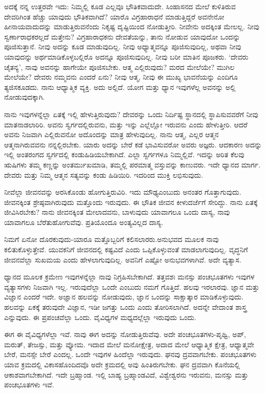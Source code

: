 ಅದಕ್ಕೆ ನನ್ನ ಉತ್ತರವೇ ಇದು: ನಿಮ್ಮಲ್ಲಿ ಕೂಡ ಎಲ್ಲವೂ ಭೌತಿಕವಾದುದೇ. ಸಿಂಹಾಸನದ ಮೇಲೆ ಕುಳಿತಿರುವ ದೇವರಿಗಿಂತ ಹೆಚ್ಚು ಯಾವುದು ಭೌತಿಕವಾಗಿದೆ? ಯಾರೊ ವಿಗ್ರಹಾರಾಧನೆ ಮಾಡುತ್ತಿದ್ದರೆ ಅವನೇನೋ ಹೀನಾಯವಾದುದನ್ನು ಮಾಡುತ್ತಿರುವನೆಂದು ನಿಕೃಷ್ಟ ದೃಷ್ಟಿಯಿಂದ ನೋಡುತ್ತೀರಿ. ನೀವೇನು ಅದಕ್ಕಿಂತ ಮೇಲಲ್ಲ. ನೀವು ಸ್ವರ್ಣಾರಾಧಕರಲ್ಲದೆ ಮತ್ತೇನು? ವಿಗ್ರಹಾರಾಧಕನು ದೇವತೆಯನ್ನು, ತಾನು ನೋಡುವ ಯಾವುದೋ ಒಂದನ್ನು ಪೂಜಿಸುತ್ತಾನೆ. ನೀವು ಅದನ್ನು ಕೂಡ ಮಾಡುವುದಿಲ್ಲ. ನೀವು ಅಧ್ಯಾತ್ಮವನ್ನೂ ಪೂಜಿಸುವುದಿಲ್ಲ, ಅಥವಾ ನೀವು ಯಾವುದನ್ನು ಅರ್ಥಮಾಡಿಕೊಳ್ಳಬಲ್ಲಿರೊ ಅದನ್ನೂ ಪೂಜಿಸುವುದಿಲ್ಲ. ನೀವು ಬರೀ ಮಾತಿನ ಪೂಜಕರು. `ದೇವರು ಚೈತನ್ಯ', ನಾವು ಅವನನ್ನು ಹಾಗೇಯೇ ಪೂಜಿಸಬೇಕು. ಆತ್ಮ ಎಲ್ಲಿರುವುದು? ಮರದ ಮೇಲೆಯೇ? ಮುಗಿಲ ಮೇಲೆಯೇ? ದೇವರು ನಮ್ಮವನು ಎಂದರೆ ಏನು? ನೀವು ಆತ್ಮ, ನೀವು ಈ ಮುಖ್ಯ ಭಾವನೆಯನ್ನು ಎಂದಿಗೂ ತ್ಯಜಿಸಕೂಡದು. ನಾನು ಆಧ್ಯಾತ್ಮಿಕ ವ್ಯಕ್ತಿ. ಅದು ಅಲ್ಲಿದೆ. ಯೋಗ ಮತ್ತು ಧ್ಯಾನ ಇವುಗಳೆಲ್ಲ ಅವನನ್ನು ಅಲ್ಲಿ ನೋಡುವುದಕ್ಕಾಗಿ.

ನಾನು ಇವುಗಳನ್ನೆಲ್ಲಾ ಏತಕ್ಕೆ ಇಲ್ಲಿ ಹೇಳುತ್ತಿರುವುದು? ದೇವರನ್ನು ಒಂದು ನಿರ್ದಿಷ್ಟ ಸ್ಥಾನದಲ್ಲಿ ಸ್ಥಾಪಿಸುವವರೆಗೆ ನೀವು ಮಾತನಾಡಲಾರಿರಿ. ಅವನು ಸ್ವರ್ಗದಲ್ಲಿರುವನು, ಮತ್ತು ಇನ್ನು ಎಲ್ಲೆಲ್ಲೋ ಇರುವನು ಎಂದು ಹೇಳುತ್ತೀರಿ. ಆದರೆ ಅವನು ನಿಜವಾಗಿ ಎಲ್ಲಿರುವನೋ ಅದೊಂದನ್ನು ಮಾತ್ರ ಹೇಳುವುದಿಲ್ಲ. ನಾನು ಆತ್ಮ, ಎಲ್ಲರ ಆತ್ಮನ ಆತ್ಮನಾಗಿರುವವನು ನನ್ನಲ್ಲಿರಬೇಕು. ಯಾರು ಅದನ್ನು ಬೇರೆ ಕಡೆ ಭಾವಿಸುವರೋ ಅವರು ಅಜ್ಞರು. ಆದಕಾರಣ ಅದನ್ನು ಇಲ್ಲಿ ಅಂತರಂಗದ ಸ್ವರ್ಗದಲ್ಲಿ ಕಂಡುಹಿಡಿಯಬೇಕಾಗಿದೆ. ಎಲ್ಲಾ ಸ್ವರ್ಗಗಳೂ ನಿಮ್ಮಲ್ಲಿವೆ. ಇದನ್ನು ಅರಿತ ಕೆಲವು ಋಷಿಗಳು ತಮ್ಮ ಕಣ್ಣನ್ನು ಅಂತರ್ಮುಖಮಾಡಿ, ತಮ್ಮಲ್ಲಿ ಪರಮಾತ್ಮ ವಸ್ತುವನ್ನು ಕಾಣುವರು. ಇದೇ ಧ್ಯಾನದ ಮಾರ್ಗ. ದೇವರು ಮತ್ತು ನಿಮ್ಮ ಆತ್ಮನ ಸತ್ಯವನ್ನು ಕಂಡು ಹಿಡಿಯಿರಿ. ಇದರಿಂದ ಮುಕ್ತಿ ಲಭಿಸುವುದು.

ನೀವೆಲ್ಲಾ ಜೀವನವನ್ನು ಅರಸಿಕೊಂಡು ಹೋಗುತ್ತಿರುವಿರಿ. ಇದು ಮೌಢ್ಯ\break ಎಂಬುದು ಅನಂತರ ಗೊತ್ತಾಗುವುದು. ಜೀವನಕ್ಕಿಂತ ಶ್ರೇಷ್ಠವಾಗಿರುವುದು ಮತ್ತೊಂದು ಇರುವುದು. ಈ ಭೌತಿಕ ಜೀವನ ಕೀಳುದರ್ಜೆಗೆ ಸೇರಿದ್ದು. ನಾನು ಏತಕ್ಕೆ ಜೀವಿಸಿರಬೇಕು? ನಾನು ಜೀವನಕ್ಕಿಂತ ಮೇಲಾದವನು, ಬಾಳುವುದು ಯಾವಾಗಲೂ ಒಂದು ದಾಸ್ಯ, ನಾವು ಯಾವಾಗಲೂ ಬೆರೆತುಹೋಗುವೆವು. ಪ್ರತಿಯೊಂದೂ ಅಂತ್ಯವಿಲ್ಲದ ದಾಸ್ಯ.

ನಿಮಗೆ ಏನೋ ದೊರಕುವುದು-ಯಾರೂ ಮತ್ತೊಬ್ಬರಿಗೆ ಕಲಿಸಲಾರರು.\break ಅನುಭವದ ಮೂಲಕ ನಾವು ಕಲಿತುಕೊಳ್ಳುತ್ತೇವೆ. ಯುವಕನಿಗೆ ಜೀವನದಲ್ಲಿ ಕಷ್ಟವಿದೆ ಎಂದು ಒಪ್ಪಿಕೊಳ್ಳುವಂತೆ ಮಾಡಲಾಗುವುದಿಲ್ಲ. ವೃದ್ಧನಿಗೆ ಜೀವನವೆಲ್ಲಾ ಸುಖಮಯ ಎಂದು ಹೇಳಲಾಗುವುದಿಲ್ಲ. ಅವನಿಗೆ ಎಷ್ಟೋ ಅನುಭವಗಳಾಗಿವೆ. ಅದೇ ವ್ಯತ್ಯಾಸ.

ಧ್ಯಾನದ ಮೂಲಕ ಕ್ರಮೇಣ ಇವುಗಳನ್ನೆಲ್ಲಾ ನಾವು ನಿಗ್ರಹಿಸಬೇಕಾಗಿದೆ. ತತ್ತವಶಃ ಮನಸ್ಸು ಪಂಚಭೂತಗಳು ಇವುಗಳ ವ್ಯತ್ಯಾಸಗಳು ನಿಜವಾಗಿ ಇಲ್ಲ. ಇರುವುದೆಲ್ಲಾ ಒಂದೇ ಎಂಬುದು ನಮಗೆ ಗೊತ್ತಿದೆ. ಹಲವು ಇರಲಾರವು. ಜ್ಞಾನ ಮತ್ತು ವಿಜ್ಞಾನ ಎಂದರೆ ಇದೇ. ಅಜ್ಞಾನ ಹಲವನ್ನು ನೋಡುವುದು, ಜ್ಞಾನ ಒಂದನ್ನು ಸಾಕ್ಷಾತ್ಕಾರ ಮಾಡಿಕೊಳ್ಳುವುದು. ಹಲವನ್ನು ಏಕಕ್ಕೆ ತರುವುದೇ ವಿಜ್ಞಾನ, ಇಡೀ ಜಗತ್ತು ಒಂದು ಎಂದು ತೋರಿಸಲಾಗಿದೆ. ಅದನ್ನೇ ವೇದಾಂತ ಶಾಸ್ತ್ರ ಎನ್ನುವುದು. ಈ ಪ್ರಪಂಚವೆಲ್ಲಾ ಒಂದು. ವೈವಿಧ್ಯಗಳ ಮಧ್ಯದಲ್ಲೆಲ್ಲಾ ಇರುವುದು ಒಂದು.

ಈಗ ಈ ವೈವಿಧ್ಯಗಳೆಲ್ಲಾ ಇವೆ. ನಾವು ಈಗ ಅದನ್ನು ನೋಡುತ್ತಿರುವೆವು. ಅದೇ ಪಂಚಭೂತಗಳು-ಪೃಥ್ವಿ, ಅಪ್, ಮರುತ್, ತೇಜಸ್ಸು, ಮತ್ತು ವ್ಯೋಮ. ಇದಾದ ಮೇಲೆ ಮನೋಕ್ಷೇತ್ರ, ಅದಾದ ಮೇಲೆ ಆಧ್ಯಾತ್ಮಿಕ ಕ್ಷೇತ್ರ, ಆಧ್ಯಾತ್ಮವೇ ಬೇರೆ, ಮನಸ್ಸೇ ಬೇರೆ ಎಂದಲ್ಲ. ಒಂದೇ ಇವುಗಳ ಹಿಂದೆಲ್ಲಾ ಇರುವುದು. ಘನವು ದ್ರವವಾಗಬೇಕು. ಪಂಚಭೂತಗಳು ಯಾವ ಕ್ರಮದಲ್ಲಿ ವಿಕಾಸಹೊಂದಿದವೊ ಅದೇ ಕ್ರಮದಲ್ಲಿ ಅವು ಹಿಂತಿರುಗಬೇಕು. ಘನ ದ್ರವವಾಗಿ ಕೊನೆಯಲ್ಲಿ ಆಕಾಶವಾಗಬೇಕಾಗಿದೆ. ಇದೇ ಬ್ರಹ್ಮಾಂಡ. ಇಲ್ಲಿ ಬಾಹ್ಯ ಬ್ರಹ್ಮಾಂಡವಿದೆ, ವಿಶ್ವೇಶ್ವರನು ಇರುವನು, ಮನಸ್ಸು ಮತ್ತು ಪಂಚಭೂತಗಳು ಇವೆ.

